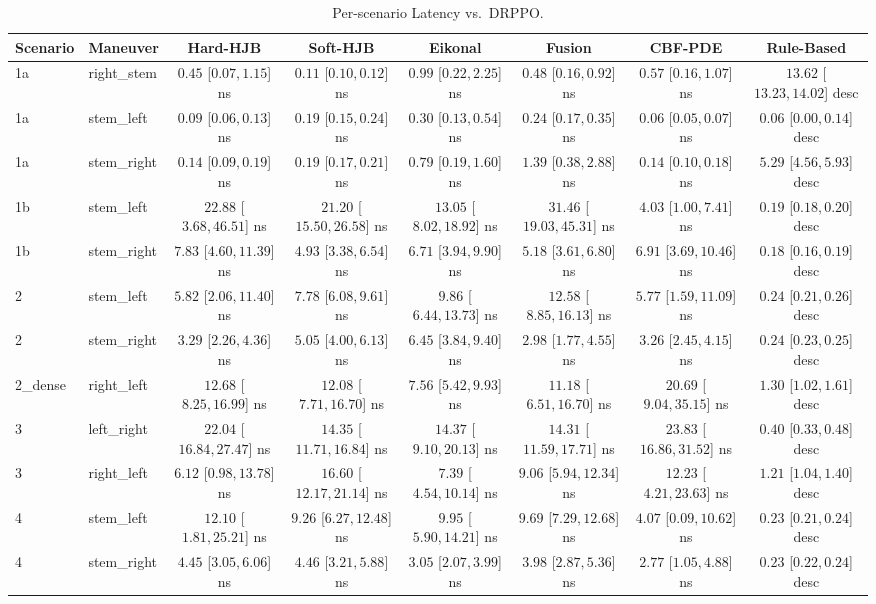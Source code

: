 \begin{table}[ht]
\centering
\caption{Per-scenario Latency vs.\ DRPPO.}
\label{tab:per_scenario_decision_latency_mean}
\begin{tabular}{llcccccc}
\toprule
Scenario & Maneuver & Hard-HJB & Soft-HJB & Eikonal & Fusion & CBF-PDE & Rule-Based \\
\midrule
1a & right_stem & $0.45$ [$0.07, 1.15$] ns & $0.11$ [$0.10, 0.12$] ns & $0.99$ [$0.22, 2.25$] ns & $0.48$ [$0.16, 0.92$] ns & $0.57$ [$0.16, 1.07$] ns & $13.62$ [$13.23, 14.02$] desc \\
1a & stem_left & $0.09$ [$0.06, 0.13$] ns & $0.19$ [$0.15, 0.24$] ns & $0.30$ [$0.13, 0.54$] ns & $0.24$ [$0.17, 0.35$] ns & $0.06$ [$0.05, 0.07$] ns & $0.06$ [$0.00, 0.14$] desc \\
1a & stem_right & $0.14$ [$0.09, 0.19$] ns & $0.19$ [$0.17, 0.21$] ns & $0.79$ [$0.19, 1.60$] ns & $1.39$ [$0.38, 2.88$] ns & $0.14$ [$0.10, 0.18$] ns & $5.29$ [$4.56, 5.93$] desc \\
1b & stem_left & $22.88$ [$3.68, 46.51$] ns & $21.20$ [$15.50, 26.58$] ns & $13.05$ [$8.02, 18.92$] ns & $31.46$ [$19.03, 45.31$] ns & $4.03$ [$1.00, 7.41$] ns & $0.19$ [$0.18, 0.20$] desc \\
1b & stem_right & $7.83$ [$4.60, 11.39$] ns & $4.93$ [$3.38, 6.54$] ns & $6.71$ [$3.94, 9.90$] ns & $5.18$ [$3.61, 6.80$] ns & $6.91$ [$3.69, 10.46$] ns & $0.18$ [$0.16, 0.19$] desc \\
2 & stem_left & $5.82$ [$2.06, 11.40$] ns & $7.78$ [$6.08, 9.61$] ns & $9.86$ [$6.44, 13.73$] ns & $12.58$ [$8.85, 16.13$] ns & $5.77$ [$1.59, 11.09$] ns & $0.24$ [$0.21, 0.26$] desc \\
2 & stem_right & $3.29$ [$2.26, 4.36$] ns & $5.05$ [$4.00, 6.13$] ns & $6.45$ [$3.84, 9.40$] ns & $2.98$ [$1.77, 4.55$] ns & $3.26$ [$2.45, 4.15$] ns & $0.24$ [$0.23, 0.25$] desc \\
2_dense & right_left & $12.68$ [$8.25, 16.99$] ns & $12.08$ [$7.71, 16.70$] ns & $7.56$ [$5.42, 9.93$] ns & $11.18$ [$6.51, 16.70$] ns & $20.69$ [$9.04, 35.15$] ns & $1.30$ [$1.02, 1.61$] desc \\
3 & left_right & $22.04$ [$16.84, 27.47$] ns & $14.35$ [$11.71, 16.84$] ns & $14.37$ [$9.10, 20.13$] ns & $14.31$ [$11.59, 17.71$] ns & $23.83$ [$16.86, 31.52$] ns & $0.40$ [$0.33, 0.48$] desc \\
3 & right_left & $6.12$ [$0.98, 13.78$] ns & $16.60$ [$12.17, 21.14$] ns & $7.39$ [$4.54, 10.14$] ns & $9.06$ [$5.94, 12.34$] ns & $12.23$ [$4.21, 23.63$] ns & $1.21$ [$1.04, 1.40$] desc \\
4 & stem_left & $12.10$ [$1.81, 25.21$] ns & $9.26$ [$6.27, 12.48$] ns & $9.95$ [$5.90, 14.21$] ns & $9.69$ [$7.29, 12.68$] ns & $4.07$ [$0.09, 10.62$] ns & $0.23$ [$0.21, 0.24$] desc \\
4 & stem_right & $4.45$ [$3.05, 6.06$] ns & $4.46$ [$3.21, 5.88$] ns & $3.05$ [$2.07, 3.99$] ns & $3.98$ [$2.87, 5.36$] ns & $2.77$ [$1.05, 4.88$] ns & $0.23$ [$0.22, 0.24$] desc \\
\bottomrule
\end{tabular}
\end{table}
